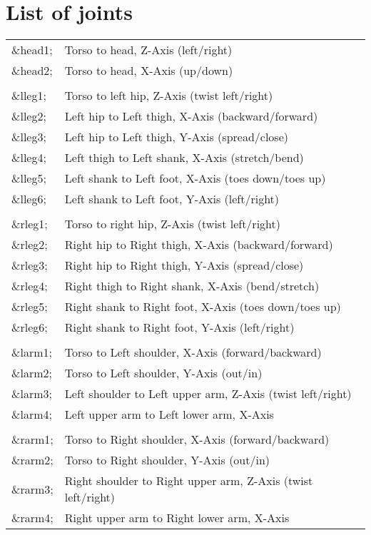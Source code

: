 \chapter{List of joints}
\begin{tabular}{ll}
\&head1; & Torso to head, Z-Axis (left/right)\\
\&head2; & Torso to head, X-Axis (up/down)\\
\\
\&lleg1; & Torso to left hip, Z-Axis (twist left/right)\\
\&lleg2; & Left hip to Left thigh, X-Axis (backward/forward)\\
\&lleg3; & Left hip to Left thigh, Y-Axis (spread/close)\\
\&lleg4; & Left thigh to Left shank, X-Axis (stretch/bend)\\
\&lleg5; & Left shank to Left foot, X-Axis (toes down/toes up)\\
\&lleg6; & Left shank to Left foot, Y-Axis (left/right)\\
\\         
\&rleg1; & Torso to right hip, Z-Axis  (twist left/right)\\
\&rleg2; & Right hip to Right thigh, X-Axis (backward/forward)\\
\&rleg3; & Right hip to Right thigh, Y-Axis (spread/close)\\
\&rleg4; & Right thigh to Right shank, X-Axis (bend/stretch)\\
\&rleg5; & Right shank to Right foot, X-Axis (toes down/toes up)\\
\&rleg6; & Right shank to Right foot, Y-Axis (left/right)\\
\\     
\&larm1; & Torso to Left shoulder, X-Axis (forward/backward)\\
\&larm2; & Torso to Left shoulder, Y-Axis (out/in)\\
\&larm3; & Left shoulder to Left upper arm, Z-Axis (twist left/right)\\
\&larm4; & Left upper arm to Left lower arm, X-Axis\\
\\     
\&rarm1; & Torso to Right shoulder, X-Axis (forward/backward)\\
\&rarm2; & Torso to Right shoulder, Y-Axis (out/in)\\
\&rarm3; & Right shoulder to Right upper arm, Z-Axis (twist left/right)\\
\&rarm4; & Right upper arm to Right lower arm, X-Axis\\

\end{tabular}


